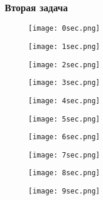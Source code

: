 \documentclass[12pt]{article}
\begin{document}
\subsubsection{Вторая задача}
\begin{figure}[H]
	\centering
	\begin{minipage}{.5\textwidth}
		\centering
		\texttt{[image: 0sec.png]}
	\end{minipage}%
	\begin{minipage}{.5\textwidth}
		\centering
		\texttt{[image: 1sec.png]}
	\end{minipage}
\end{figure}

\begin{figure}[H]
	\centering
	\begin{minipage}{.5\textwidth}
		\centering
		\texttt{[image: 2sec.png]}
	\end{minipage}%
	\begin{minipage}{.5\textwidth}
		\centering
		\texttt{[image: 3sec.png]}
	\end{minipage}
\end{figure}

\begin{figure}[H]
	\centering
	\begin{minipage}{.5\textwidth}
		\centering
		\texttt{[image: 4sec.png]}
	\end{minipage}%
	\begin{minipage}{.5\textwidth}
		\centering
		\texttt{[image: 5sec.png]}
	\end{minipage}
\end{figure}

\begin{figure}[H]
	\centering
	\begin{minipage}{.5\textwidth}
		\centering
		\texttt{[image: 6sec.png]}
	\end{minipage}%
	\begin{minipage}{.5\textwidth}
		\centering
		\texttt{[image: 7sec.png]}
	\end{minipage}
\end{figure}

\begin{figure}[H]
	\centering
	\begin{minipage}{.5\textwidth}
		\centering
		\texttt{[image: 8sec.png]}
	\end{minipage}%
	\begin{minipage}{.5\textwidth}
		\centering
		\texttt{[image: 9sec.png]}
	\end{minipage}
\end{figure}
\end{document}
